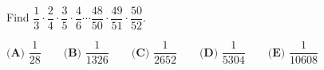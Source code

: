 Find \(\dfrac{1}{3}\cdot\dfrac{2}{4}\cdot\dfrac{3}{5}\cdot\dfrac{4}{6}\cdots\dfrac{48}{50}\cdot\dfrac{49}{51}\cdot\dfrac{50}{52}\).

\(\textbf{(A) } \dfrac{1}{28} \qquad\textbf{(B) } \dfrac{1}{1326} \qquad\textbf{(C) } \dfrac{1}{2652} \qquad\textbf{(D) } \dfrac{1}{5304} \qquad\textbf{(E) } \dfrac{1}{10608}\)
